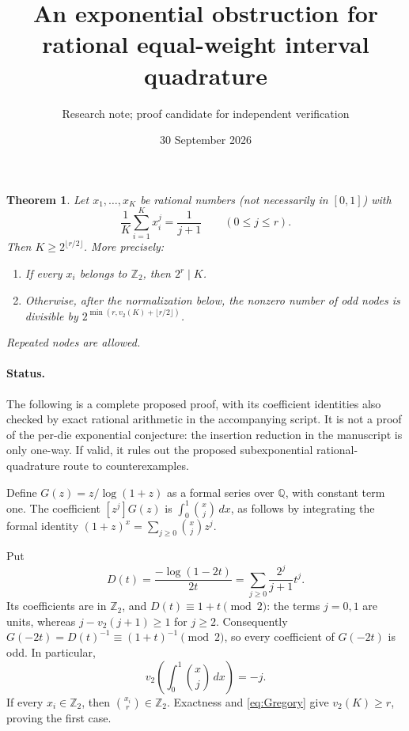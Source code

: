 \documentclass[11pt]{article}
\newtheorem{theorem}{Theorem}
\newcommand{\vii}{v_2}
\newcommand{\Zii}{\mathbb Z_2}
\begin{document}
\title{An exponential obstruction for rational equal-weight interval quadrature}
\author{Research note; proof candidate for independent verification}
\date{30 September 2026}
\maketitle

\begin{theorem}\label{thm:main}
Let $x_1,\ldots,x_K$ be rational numbers (not necessarily in $[0,1]$)
with
\[
 \frac1K\sum_{i=1}^K x_i^j=\frac1{j+1}\qquad(0\leq j\leq r).
\]
Then $K\geq 2^{\lfloor r/2\rfloor}$. More precisely:
\begin{enumerate}
\item If every $x_i$ belongs to $\Zii$, then $2^r\mid K$.
\item Otherwise, after the normalization below, the nonzero number of odd nodes is divisible by $2^{\min(r,\vii(K)+\lfloor r/2\rfloor)}$.
\end{enumerate}
Repeated nodes are allowed.
\end{theorem}

\paragraph{Status.}
The following is a complete proposed proof, with its coefficient identities
also checked by exact rational arithmetic in the accompanying script.
It is not a proof of the per-die exponential conjecture: the insertion
reduction in the manuscript is only one-way. If valid, it rules out the
proposed subexponential rational-quadrature route to counterexamples.

Define $G(z)=z/\log(1+z)$ as a formal series over $\mathbb Q$, with constant
term one. The coefficient $[z^j]G(z)$ is
$\int_0^1\binom{x}{j}\,dx$, as follows by integrating the formal identity
$(1+z)^x=\sum_{j\geq0}\binom{x}{j}z^j$.

Put
\[
 D(t)=\frac{-\log(1-2t)}{2t}
     =\sum_{j\geq0}\frac{2^j}{j+1}t^j.
\]
Its coefficients are in $\Zii$, and $D(t)\equiv1+t\pmod2$: the terms
$j=0,1$ are units, whereas $j-\vii(j+1)\geq1$ for $j\geq2$.
Consequently $G(-2t)=D(t)^{-1}\equiv(1+t)^{-1}\pmod2$, so every
coefficient of $G(-2t)$ is odd. In particular,
\begin{equation}\label{eq:Gregory}
 \vii\left(\int_0^1\binom{x}{j}\,dx\right)=-j.
\end{equation}
If every $x_i\in\Zii$, then $\binom{x_i}{r}\in\Zii$.
Exactness and \eqref{eq:Gregory} give $\vii(K)\geq r$, proving the first case.
\end{document}
